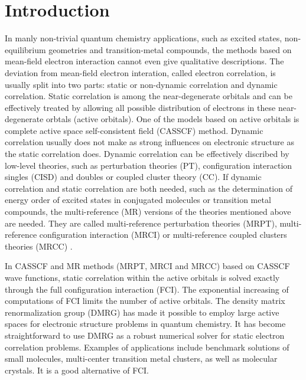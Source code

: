 
\section{Introduction}

In manly non-trivial quantum chemistry applications, such as excited states, non-equilibrium geometries and transition-metal compounds, the methods based on mean-field electron interaction cannot even give qualitative descriptions. 
The deviation from mean-field electron interation, called electron correlation, is usually split into two parts: static or non-dynamic correlation and dynamic correlation.
Static correlation is among the near-degenerate orbitals and can be effectively treated by allowing all possible distribution of electrons in these near-degenerate orbtals (active orbitals).  
One of the models based on active orbitals is complete active space self-consistent field (CASSCF) method. Dynamic correlation usually does not make as strong influences on electronic structure as the static correlation does. Dynamic correlation can be effectively discribed by low-level theories, such as perturbation theories (PT), configuration interaction singles (CISD)  and doubles or coupled cluster theory (CC). If dynamic correlation and static correlation are both needed, such as the determination of energy order of excited states in conjugated molecules or transition metal compounds, the multi-reference (MR) versions of the theories mentioned above are needed. They are called multi-reference perturbation theories (MRPT)\cite{andersson_second-order_1990}, multi-reference configuration interaction (MRCI)\cite{buenker_individualized_1974} or multi-reference coupled clusters theories (MRCC) \cite{oliphant_multireference_1991}.

In CASSCF and MR methods (MRPT, MRCI and MRCC) based on CASSCF wave functions, static correlation within the active orbitals is solved exactly through the full configuration interaction (FCI). The exponential increasing of computations of FCI limits the number of active orbitals. The density matrix renormalization group (DMRG) \cite{white_density_1992,white_density-matrix_1993, ostlund_thermodynamic_1995, rommer_class_1997, schollwock_density-matrix_2005, schollwock_density-matrix_2011} has made it possible to employ large active spaces 
for electronic structure problems in quantum chemistry.\cite{white_ab_1999, chan_highly_2002, legeza_controlling_2003,moritz_decomposition_2007, verstraete_matrix_2008, marti_density_2008, zgid_spin_2008, marti_density_2010, kurashige_high-performance_2009, luo_optimizing_2010, chan_density_2011, marti_new_2011, sharma_spin-adapted_2012, wouters_longitudinal_2012, wouters_thouless_2013, kurashige_entangled_2013, wouters_communication:_2014} It has become straightforward to use DMRG as a robust numerical solver for 
static electron correlation problems. Examples of applications include benchmark solutions of small molecules\cite{chan_highly_2002,legeza_controlling_2003,luo_optimizing_2010, olivares-amaya_ab-initio_2015}, multi-center transition metal clusters\cite{kurashige_high-performance_2009,marti_new_2011, kurashige_entangled_2013, sharma_low-energy_2014}, as well as molecular crystals\cite{yang_ab_2014}. It is a good alternative of FCI.

